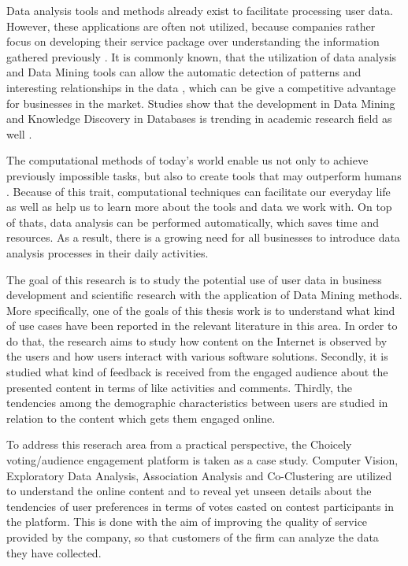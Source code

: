     Data analysis tools and methods already exist to facilitate processing user data. However, these applications are often not utilized, because companies rather focus on developing their service package over understanding the information gathered previously \cite{bigdatamanagementrevolution, inmon2007tapping}. It is commonly known, that the utilization of data analysis and Data Mining tools can allow the automatic detection of patterns and interesting relationships in the data \cite{introtodatamining, Friedman97datamining}, which can be give a competitive advantage for businesses in the market. Studies show that the development in Data Mining and Knowledge Discovery in Databases is trending in academic research field as well \cite{bigdatamanagementrevolution, zarsky2002mine}.

    The computational methods of today's world enable us not only to achieve previously impossible tasks, but also to create tools that may outperform humans \cite{youyou2015computer}. Because of this trait, computational techniques can facilitate our everyday life as well as help us to learn more about the tools and data we work with. On top of thats, data analysis can be performed automatically, which saves time and resources. As a result, there is a growing need for all businesses to introduce data analysis processes in their daily activities.
    
    The goal of this research is to study the potential use of user data in business development and scientific research with the application of Data Mining methods. More specifically, one of the goals of this thesis work is to understand what kind of use cases have been reported in the relevant literature in this area. In order to do that, the research aims to study how content on the Internet is observed by the users and how users interact with various software solutions. Secondly, it is studied what kind of feedback is received from the engaged audience about the presented content in terms of like activities and comments. Thirdly, the tendencies among the demographic characteristics between users are studied in relation to the content which gets them engaged online.
    
    To address this reserach area from a practical perspective, the Choicely voting/audience engagement platform is taken as a case study. Computer Vision, Exploratory Data Analysis, Association Analysis and Co-Clustering are utilized to understand the online content and to reveal yet unseen details about the tendencies of user preferences in terms of votes casted on contest participants in the platform. This is done with the aim of improving the quality of service provided by the company, so that customers of the firm can analyze the data they have collected.
    
